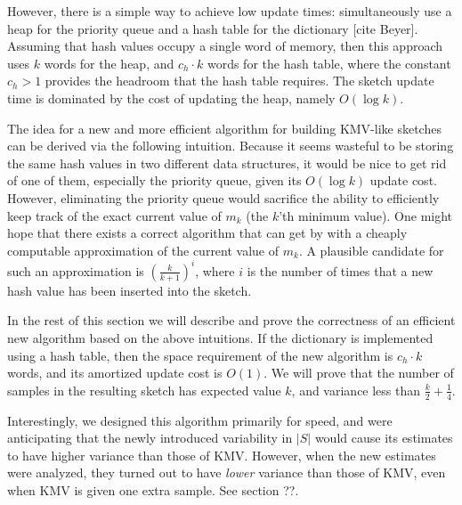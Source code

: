 \documentclass{sig-alternate}
\begin{document}
However, there is a simple way to achieve low update times:
simultaneously use a heap for the priority queue and a hash table for
the dictionary [cite Beyer]. Assuming that hash values occupy a single word of
memory, then this approach uses $k$ words for the heap, and $c_h \cdot k$ words for the hash table, 
where the constant $c_h > 1$ provides the headroom that the hash table requires.  The sketch update time is
dominated by the cost of updating the heap, namely $O(\log k)$.


The idea for a new and more efficient algorithm for building KMV-like
sketches can be derived via the following intuition.  Because it seems
wasteful to be storing the same hash values in two different data
structures, it would be nice to get rid of one of them, especially the priority
queue, given its $O(\log k)$ update cost.  However, eliminating the
priority queue would sacrifice the ability to efficiently keep track
of the exact current value of $m_k$ (the $k$'th minimum value).
One might hope that there exists a correct algorithm that can
get by with a cheaply computable approximation of the current value of
$m_k$. A plausible candidate for such an approximation is
$(\frac{k}{k+1})^i$, where $i$ is the number of times that a new hash
value has been inserted into the sketch.

In the rest of this section we will describe and prove the correctness of an efficient
new algorithm based on the above intuitions. If the dictionary is implemented using a hash table,
then the space requirement of the new algorithm is $c_h \cdot k$ words, and its amortized update cost is $O(1)$.
We will prove that the number of samples in the resulting sketch has expected value $k$, 
and variance less than $\frac{k}{2} + \frac{1}{4}$.

Interestingly, we designed this algorithm primarily for speed, and were anticipating
that the newly introduced variability in $|S|$ would cause its estimates to have higher
variance than those of KMV. However, when the new estimates were analyzed, they turned out
to have {\em lower} variance than those of KMV, even when KMV is given one extra sample.
See section ??.
\end{document}
